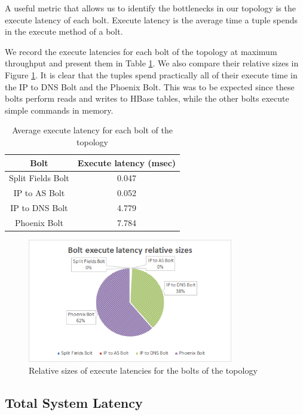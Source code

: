 A useful metric that allows us to identify the bottlenecks in our topology is the execute latency of each bolt. Execute latency is the average time a tuple spends in the execute method of a bolt. 

We record the execute latencies for each bolt of the topology at maximum throughput and present them in Table \ref{table:execute_latencies}. We also compare their relative sizes in Figure \ref{figure:benchmarks_storm_execute_latencies}. It is clear that the tuples spend practically all of their execute time in the IP to DNS Bolt and the Phoenix Bolt. This was to be expected since these bolts perform reads and writes to HBase tables, while the other bolts execute simple commands in memory.

\begin{table}[H]
\centering
\begin{tabular}{ |c|c| }
\hline
Bolt & Execute latency (msec) \\ \hline \hline
Split Fields Bolt & 0.047 \\ \hline
IP to AS Bolt & 0.052 \\ \hline
IP to DNS Bolt & 4.779 \\ \hline
Phoenix Bolt & 7.784 \\ \hline
\end{tabular}
\caption{Average execute latency for each bolt of the topology}
\label{table:execute_latencies}
\end{table}

\begin{figure}[H]
\centering
\includegraphics[width=0.8\textwidth]{figures/benchmarks_storm_execute_latencies}
\caption{Relative sizes of execute latencies for the bolts of the topology}
\label{figure:benchmarks_storm_execute_latencies}
\end{figure}

\subsection{Total System Latency}

